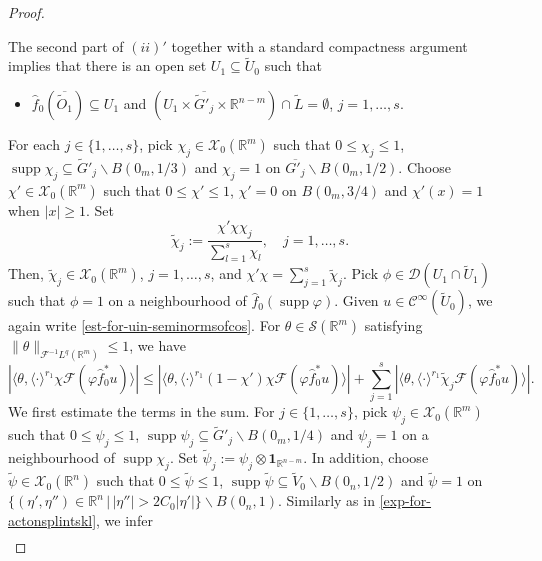 \documentclass[12pt,reqno]{amsart}
\newcommand{\RR}{\mathbb R}
\newcommand{\DD}{\mathcal D}
\newcommand{\SSS}{\mathcal S}
\newcommand{\XX}{\mathcal X}
\newcommand{\supp}{\operatorname{supp}}
\theoremstyle{plain}
\theoremstyle{remark}
\theoremstyle{definition}
\numberwithin{equation}{section}
\begin{document}
\begin{proof}
\begin{itemize}
\end{itemize}
The second part of $(ii)'$ together with a standard compactness argument implies that there is an open set $U_1\subseteq \widetilde{U}_0$ such that
\begin{itemize}
\item[$(iv)'$] $\hat{f}_0(\overline{\widetilde{O}_1})\subseteq U_1$ and $(U_1\times \overline{\widetilde{G}'_j}\times \RR^{n-m})\cap \widetilde{L}=\emptyset$, $j=1,\ldots,s$.
\end{itemize}
For each $j\in\{1,\ldots,s\}$, pick $\chi_j\in\XX_0(\RR^m)$ such that $0\leq \chi_j\leq 1$, $\supp\chi_j\subseteq \widetilde{G}'_j\backslash B(0_m,1/3)$ and $\chi_j=1$ on $\overline{G'_j}\backslash B(0_m,1/2)$. Choose $\chi'\in\XX_0(\RR^m)$ such that $0\leq \chi'\leq 1$, $\chi'=0$ on $B(0_m,3/4)$ and $\chi'(x)=1$ when $|x|\geq 1$. Set
\begin{equation*}
\widetilde{\chi}_j:=\frac{\chi'\chi\chi_j}{\sum_{l=1}^s\chi_l},\quad j=1,\ldots,s.
\end{equation*}
Then, $\widetilde{\chi}_j\in\XX_0(\RR^m)$, $j=1,\ldots,s$, and $\chi'\chi=\sum_{j=1}^s\widetilde{\chi}_j$. Pick $\phi\in\DD(U_1\cap\widetilde{U}_1)$ such that $\phi=1$ on a neighbourhood of $\hat{f}_0(\supp\varphi)$. Given $u\in\mathcal{C}^{\infty}(\widetilde{U}_0)$, we again write \eqref{est-for-uin-seminormsofcos}. For $\theta\in\SSS(\RR^m)$ satisfying $\|\theta\|_{\mathcal{F}^{-1}L^q(\RR^m)}\leq 1$, we have
\begin{equation}\label{est-for-mai-reskls11}
|\langle \theta,\langle\cdot\rangle^{r_1}\chi\mathcal{F}(\varphi \hat{f}_0^*u)\rangle|\leq |\langle \theta,\langle\cdot\rangle^{r_1}(1-\chi')\chi\mathcal{F}(\varphi \hat{f}_0^*u)\rangle|+\sum_{j=1}^s|\langle \theta,\langle\cdot\rangle^{r_1}\widetilde{\chi}_j\mathcal{F}(\varphi \hat{f}_0^*u)\rangle|.
\end{equation}
We first estimate the terms in the sum. For $j\in\{1,\ldots,s\}$, pick $\psi_j\in\XX_0(\RR^m)$ such that $0\leq \psi_j\leq 1$, $\supp\psi_j\subseteq \widetilde{G}'_j\backslash B(0_m,1/4)$ and $\psi_j=1$ on a neighbourhood of $\supp\chi_j$. Set $\widetilde{\psi}_j:=\psi_j\otimes\mathbf{1}_{\RR^{n-m}}$. In addition, choose $\widetilde{\psi}\in\XX_0(\RR^n)$ such that $0\leq \widetilde{\psi}\leq 1$, $\supp\widetilde{\psi}\subseteq \widetilde{V}_0\backslash B(0_n,1/2)$ and $\widetilde{\psi}=1$ on $\{(\eta',\eta'')\in\RR^n\,|\, |\eta''|>2C_0|\eta'|\}\backslash B(0_n,1)$. Similarly as in \eqref{exp-for-actonsplintskl}, we infer
\begin{align*}

\end{align*}
\end{proof}
\end{document}
